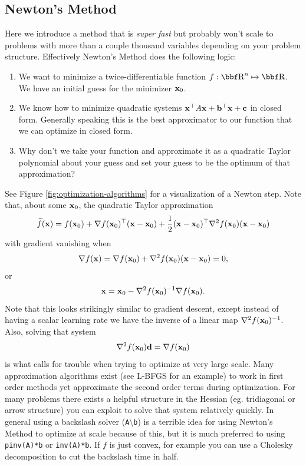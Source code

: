 \documentclass{article}
\begin{document}
\subsection{Newton's Method}

Here we introduce a method that is \textit{super fast} but probably won't scale
to problems with more than a couple thousand variables depending on your
problem structure. Effectively Newton's Method does the following logic:
\begin{enumerate}
    \item We want to minimize a twice-differentiable function $f : \RR^n \mapsto \RR$. We have an
        initial guess for the minimizer ${\bf x}_0$.
    \item We know how to minimize quadratic systems ${\bf x}^\top A{\bf x} + {\bf b}^\top{\bf x} + {\bf c}$
        in closed form. Generally speaking this is the best approximator to our function
        that we can optimize in closed form.
    \item Why don't we take your function and approximate it as a quadratic Taylor
        polynomial about your guess and set your guess to be the optimum of that
        approximation?
\end{enumerate}
See Figure \ref{fig:optimization-algorithms} for a visualization of a Newton step. Note 
that, about some ${\bf x}_0$, the quadratic Taylor approximation
\[
    \widetilde f({\bf x}) = f({\bf x}_0) + \nabla f({\bf x}_0)^\top({\bf x} - {\bf x}_0) + \frac{1}{2}({\bf x}-{\bf x}_0)^\top\nabla^2 f({\bf x}_0)({\bf x}-{\bf x}_0)
\]
with gradient vanishing when
\[
    \nabla f({\bf x}) = \nabla f({\bf x}_0) + \nabla^2 f({\bf x}_0)({\bf x}-{\bf x}_0) = 0,
\]
or
\[
    {\bf x} = {\bf x}_0 - \nabla^2 f({\bf x}_0)^{-1} \nabla f({\bf x}_0).
\]
Note that this looks strikingly similar to gradient descent, except instead of having
a scalar learning rate we have the inverse of a linear map $\nabla^2 f({\bf x}_0)^{-1}$.
Also, solving that system
\[
    \nabla^2f({\bf x}_0){\bf d} = \nabla f({\bf x}_0)
\]
is what calls for trouble when trying to optimize at very large scale.
Many approximation algorithms exist (see L-BFGS for an example) to work
in first order methods yet approximate the second order terms during optimization.
For many problems there exists a helpful structure in the Hessian (eg. tridiagonal
or arrow structure) you can exploit to solve that system relatively quickly. In
general using a backslash solver (\texttt{A$\setminus$b}) is a terrible idea for
using Newton's Method to optimize at scale because of this, but it is much preferred
to using \texttt{pinv(A)*b} or \texttt{inv(A)*b}. If $f$ is just convex, for example you can use a
Cholesky decomposition to cut the backslash time in half.
\end{document}
